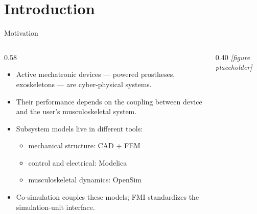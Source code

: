 
\section{Introduction}

\begin{frame}{Motivation}
\begin{columns}[T]
\begin{column}{0.58\textwidth}
\begin{itemize}
    \item Active mechatronic devices --- powered prostheses, exoskeletons --- are cyber-physical systems.
    \item Their performance depends on the coupling between device and the user's musculoskeletal system.
    \item Subsystem models live in different tools:
    \begin{itemize}
        \item mechanical structure: \ac{CAD} + \ac{FEM}
        \item control and electrical: Modelica
        \item musculoskeletal dynamics: OpenSim
    \end{itemize}
    \item Co-simulation couples these models; \ac{FMI} standardizes the simulation-unit interface.
\end{itemize}
\end{column}
\begin{column}{0.40\textwidth}
\centering
\textit{[figure placeholder]}
\end{column}
\end{columns}
\end{frame}

